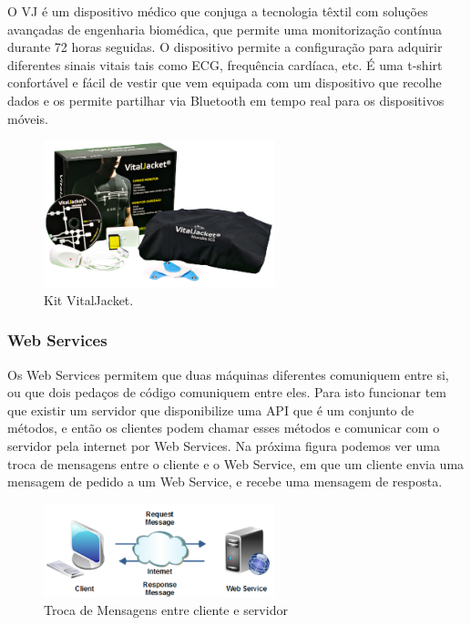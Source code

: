 \documentclass[11pt,twoside,a4paper]{report}
\begin{document}
O \gls{VJ} é um dispositivo médico que conjuga a tecnologia têxtil com soluções avançadas de engenharia biomédica, que permite uma monitorização contínua durante 72 horas seguidas. O dispositivo permite a configuração para adquirir diferentes sinais vitais tais como \gls{ECG}, frequência cardíaca, etc. É uma t-shirt confortável e fácil de vestir que vem equipada com um dispositivo que recolhe dados e os permite partilhar via Bluetooth em tempo real para os dispositivos móveis. \cite{vj}

\begin{figure}[H]
  \centering
  \includegraphics[width=0.6\textwidth]{imgs/vj.png}
  \caption[Kit VitalJacket]{Kit VitalJacket. \cite{vj}}
  \label{f:vjkit}
\end{figure}

\subsubsection{Web Services}

Os Web Services permitem que duas máquinas diferentes comuniquem entre si, ou que dois pedaços de código comuniquem entre eles. Para isto funcionar tem que existir um servidor que disponibilize uma \gls{API} que é um conjunto de métodos, e então os clientes podem chamar esses métodos e comunicar com o servidor pela internet por Web Services. Na próxima figura podemos ver uma troca de mensagens entre o cliente e o Web Service, em que um cliente envia uma mensagem de pedido a um Web Service, e recebe uma mensagem de resposta.



\begin{figure}[H]
  \centering
  \includegraphics[width=0.6\textwidth]{imgs/wsscheme.png}
  \caption[Troca de Mensagens entre cliente e servidor]{Troca de Mensagens entre cliente e servidor \cite{wsjakob}}
  \label{f:wsscheme}
\end{figure}
\end{document}
